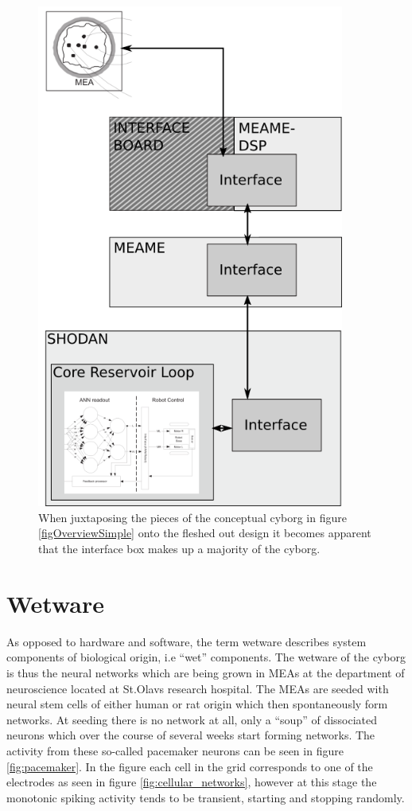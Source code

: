 \begin{figure}[h]
  \centering
  \includegraphics[width=0.9\textwidth]{fig/ConceptMap.png}
  \caption{
    When juxtaposing the pieces of the conceptual cyborg in figure
    \ref{figOverviewSimple} onto the fleshed out design it becomes apparent that the
    interface box makes up a majority of the cyborg.
  }
  \label{figJuxta}
\end{figure}
\section{Wetware}
As opposed to hardware and software, the term wetware describes system
components of biological origin, i.e ``wet'' components.
The wetware of the cyborg is thus the neural networks which are being grown in
MEAs at the department of neuroscience located at St.Olavs research hospital.
The MEAs are seeded with neural stem cells of either human or rat origin which
then spontaneously form networks.
At seeding there is no network at all, only a ``soup'' of dissociated
neurons which over the course of several weeks start forming networks.
The activity from these so-called pacemaker neurons can be seen in figure
\ref{fig:pacemaker}.
In the figure each cell in the grid corresponds to one of the
electrodes as seen in figure \ref{fig:cellular_networks}, however at this stage the
monotonic spiking activity tends to be transient, starting and stopping
randomly.
